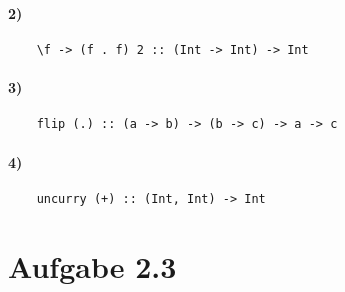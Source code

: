 \documentclass[a4paper]{scrartcl}
\begin{document}
\paragraph{2)}
\begin{verbatim}
    \f -> (f . f) 2 :: (Int -> Int) -> Int
\end{verbatim}

\paragraph{3)}
\begin{verbatim}
    flip (.) :: (a -> b) -> (b -> c) -> a -> c
\end{verbatim}

\paragraph{4)}
\begin{verbatim}
    uncurry (+) :: (Int, Int) -> Int
\end{verbatim}


\section*{Aufgabe 2.3}
\inputminted{haskell}{collatz.hs}
\end{document}
